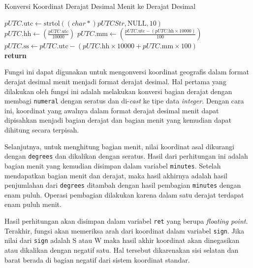 \begin{algorithm}[H]
	\caption{Konversi Koordinat Derajat Desimal Menit ke Derajat Desimal}
	\label{alg: 3-convert2deg}
	\begin{algorithmic}[1]
		\State $pUTC.\text{utc} \gets \text{strtol}((char *)pUTCStr, \text{NULL}, 10)$
		\\
		\State $pUTC.\text{hh} \gets \left(\frac{pUTC.\text{utc}}{10000}\right)$
		\State $pUTC.\text{mm} \gets \left(\frac{pUTC.\text{utc} - (pUTC.\text{hh} \times 10000)}{100}\right)$
		\State $pUTC.\text{ss} \gets pUTC.\text{utc} - (pUTC.\text{hh} \times 10000 + pUTC.\text{mm} \times 100)$
		\\
		\State \textbf{return}
	\EndProcedure	
	\end{algorithmic}
\end{algorithm}

Fungsi ini dapat digunakan untuk mengonversi koordinat geografis dalam format derajat desimal menit menjadi format derajat desimal. Hal pertama yang dilakukan oleh fungsi ini adalah melakukan konversi bagian derajat dengan membagi \texttt{numeral} dengan seratus dan di-\textit{cast} ke tipe data \textit{integer}. Dengan cara ini, koordinat yang awalnya dalam format derajat desimal menit dapat dipisahkan menjadi bagian derajat dan bagian menit yang kemudian dapat dihitung secara terpisah.

Selanjutnya, untuk menghitung bagian menit, nilai koordinat asal dikurangi dengan \texttt{degrees} dan dikalikan dengan seratus. Hasil dari perhitungan ini adalah bagian menit yang kemudian disimpan dalam variabel \texttt{minutes}. Setelah mendapatkan bagian menit dan derajat, maka hasil akhirnya adalah hasil penjumlahan dari \texttt{degrees} ditambah dengan hasil pembagian \texttt{minutes} dengan enam puluh. Operasi pembagian dilakukan karena dalam satu derajat terdapat enam puluh menit.

Hasil perhitungan akan disimpan dalam variabel \texttt{ret} yang berupa \textit{floating point}. Terakhir, fungsi akan memeriksa arah dari koordinat dalam variabel \texttt{sign}. Jika nilai dari \texttt{sign} adalah S atau W maka hasil akhir koordinat akan dinegasikan atau dikalikan dengan negatif satu. Hal tersebut dikarenakan sisi selatan dan barat berada di bagian negatif dari sistem koordinat standar.

